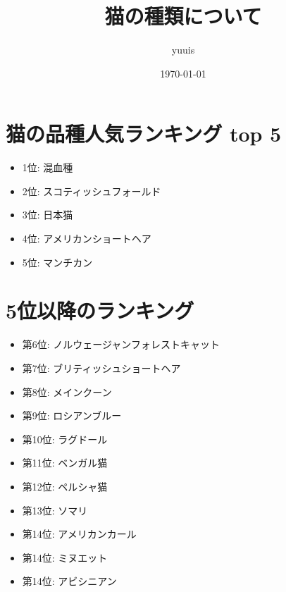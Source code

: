 \documentclass[uplatex]{jsarticle}
\begin{document}
\title{\huge 猫の種類について}
\author{yuuis}
\date{\today}
\maketitle

\section{猫の品種人気ランキング top 5}
    \begin{itemize}
        \item 1位: 混血種
        \item 2位: スコティッシュフォールド
        \item 3位: 日本猫
        \item 4位: アメリカンショートヘア
        \item 5位: マンチカン
    \end{itemize}

\section{5位以降のランキング}
    \begin{itemize}
      \item 第6位: ノルウェージャンフォレストキャット
      \item 第7位: ブリティッシュショートヘア
      \item 第8位: メインクーン
      \item 第9位: ロシアンブルー
      \item 第10位: ラグドール
      \item 第11位: ベンガル猫
      \item 第12位: ペルシャ猫
      \item 第13位: ソマリ
      \item 第14位: アメリカンカール
      \item 第14位: ミヌエット
      \item 第14位: アビシニアン
    \end{itemize}
\end{document}
